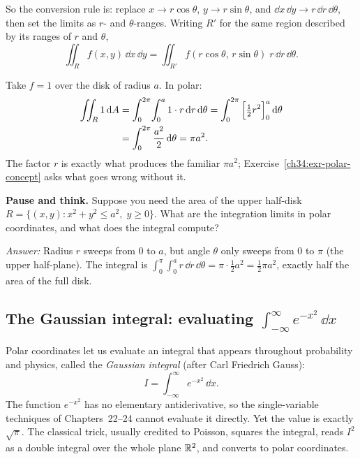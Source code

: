 So the conversion rule is: replace $x\to r\cos\theta$, $y\to r\sin\theta$, and
$\dd x\,\dd y\to r\,\dd r\,\dd\theta$, then set the limits as $r$- and
$\theta$-ranges. Writing $R'$ for the same region described by its ranges of $r$
and $\theta$,
\[
  \iint_R f(x,y)\,\dd x\,\dd y
  =\iint_{R'} f(r\cos\theta,\,r\sin\theta)\;r\,\dd r\,\dd\theta .
\]

\begin{example}
\label{ch34:ex-disk}
Take $f=1$ over the disk of radius $a$. In polar:
\begin{align*}
  \iint_R 1\,\mathrm{d} A &= \int_0^{2\pi}\!\int_0^a 1\cdot r\,\mathrm{d} r\,\mathrm{d}\theta
  = \int_0^{2\pi}\Big[\tfrac12 r^2\Big]_{0}^{a}\,\mathrm{d}\theta \\
  &= \int_0^{2\pi}\frac{a^2}{2}\,\mathrm{d}\theta = \pi a^2 .
\end{align*}
The factor $r$ is exactly what produces the familiar $\pi a^2$; Exercise~\ref{ch34:exr-polar-concept} asks what goes wrong without it.
\end{example}

\begin{recoverybox}
\textbf{Pause and think.}
Suppose you need the area of the upper half-disk $R = \{(x,y) : x^2+y^2\le a^2,\; y\ge 0\}$.
What are the integration limits in polar coordinates, and what does the integral compute?

\emph{Answer:} Radius $r$ sweeps from $0$ to $a$, but angle $\theta$ only sweeps from $0$
to $\pi$ (the upper half-plane). The integral is
$\int_0^\pi\!\int_0^a r\,\dd r\,\dd\theta = \pi \cdot \tfrac12 a^2 = \tfrac12\pi a^2$, exactly
half the area of the full disk.
\end{recoverybox}

\subsection{The Gaussian integral: evaluating $\int_{-\infty}^\infty e^{-x^2}\,\dd x$}

Polar coordinates let us evaluate an integral that appears throughout
probability and physics, called the \emph{Gaussian integral} (after Carl
Friedrich Gauss):
\[
  I=\int_{-\infty}^{\infty} e^{-x^2}\,\dd x .
\]
The function $e^{-x^2}$ has no elementary antiderivative, so the single-variable
techniques of Chapters~22--24 cannot evaluate it directly. Yet the value is
exactly $\sqrt{\pi}$. The classical trick, usually credited to Poisson, squares
the integral, reads $I^2$ as a double integral over the whole plane $\mathbb{R}^2$, and
converts to polar coordinates.

